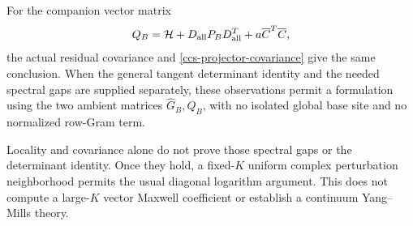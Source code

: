 For the companion vector matrix
\[
 Q_B=\mathcal H+D_{\rm all}P_BD_{\rm all}^T
                         +a\overline C^T\overline C,
\]
the actual residual covariance and
\eqref{ccs-projector-covariance} give the same conclusion.
When the general tangent determinant identity and the needed
spectral gaps are supplied separately, these observations
permit a formulation using the two ambient matrices
\(\widehat G_B,Q_B\), with no isolated global base site and
no normalized row-Gram term.

Locality and covariance alone do not prove those spectral gaps
or the determinant identity. Once they hold, a fixed-\(K\)
uniform complex perturbation neighborhood permits the usual
diagonal logarithm argument. This does not compute a
large-\(K\) vector Maxwell coefficient or establish a
continuum Yang--Mills theory.
